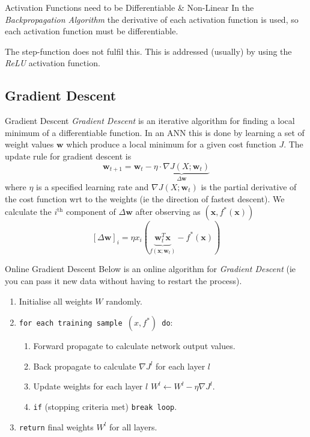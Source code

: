 \documentclass[11pt,a4paper]{article}
\begin{document}
  \begin{remark}{Activation Functions need to be Differentiable \& Non-Linear}
    In the \textit{Backpropagation Algorithm} the derivative of each activation function is used, so each activation function must be differentiable.
    \par The step-function does not fulfil this. This is addressed (usually) by using the \textit{ReLU} activation function.
  \end{remark}

\subsection{Gradient Descent}

  \begin{definition}{Gradient Descent}
    \textit{Gradient Descent} is an iterative algorithm for finding a local minimum of a differentiable function. In an ANN this is done by learning a set of weight values $\pmb{w}$ which produce a local minimum for a given cost function $J$. The update rule for gradient descent is
    \[ \pmb{w}_{t+1}=\pmb{w}_t-\underbrace{\eta\cdot\nabla J(X;\pmb{w}_t)}_{\Delta\pmb{w}} \]
    where $\eta$ is a specified learning rate and $\nabla J(X;\pmb{w}_t)$ is the partial derivative of the cost function wrt to the weights (ie the direction of fastest descent). We calculate the $i^\text{th}$ component of $\Delta\pmb{w}$ after observing as $(\pmb{x},f^*(\pmb{x}))$
    \[ [\Delta\pmb{w}]_i=\eta x_i(\underbrace{\pmb{w}^T_t\pmb{x}}_{f(\pmb{x};\pmb{w}_t)}-f^*(\pmb{x})) \]
  \end{definition}

  \begin{definition}{Online Gradient Descent}
    Below is an online algorithm for \textit{Gradient Descent} (ie you can pass it new data without having to restart the process).
    \begin{enumerate}
      \item Initialise all weights $W$ randomly.
      \item \texttt{for each training sample $(x,f^*)$ do}:
      \begin{enumerate}
        \item Forward propagate to calculate network output values.
        \item Back propagate to calculate $\nabla J^l$ for each layer $l$
        \item Update weights for each layer $l$  $W^l\leftarrow W^l-\eta\nabla J^l$.
        \item \texttt{if} (stopping criteria met) \texttt{break loop}.
      \end{enumerate}
      \item \texttt{return} final weights $W^l$ for all layers.
    \end{enumerate}
  \end{definition}
\end{document}
